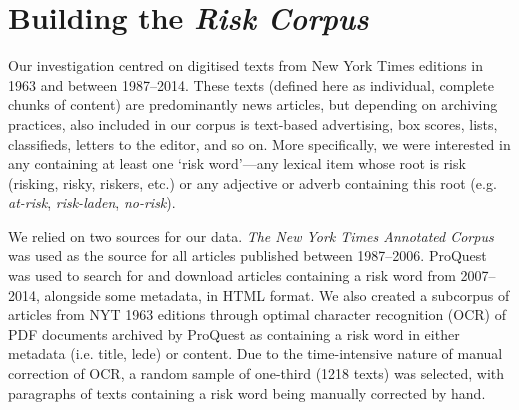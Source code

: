 \section{Building the \emph{Risk Corpus}}

Our investigation centred on digitised texts from New York Times editions in 1963 and between 1987--2014. These texts (defined here as individual, complete chunks of content) are predominantly news articles, but depending on archiving practices, also included in our corpus is text-based advertising, box scores, lists, classifieds, letters to the editor, and so on. More specifically, we were interested in any containing at least one `risk word'---any lexical item whose root is risk (risking, risky, riskers, etc.) or any adjective or adverb containing this root (e.g. \emph{at-risk}, \emph{risk-laden}, \emph{no-risk}).

We relied on two sources for our data. \emph{The New York Times Annotated Corpus} was used as the source for all articles published between 1987--2006. ProQuest was used to search for and download articles containing a risk word from 2007--2014, alongside some metadata, in HTML format. We also created a subcorpus of articles from NYT 1963 editions through optimal character recognition (OCR) of PDF documents archived by ProQuest as containing a risk word in either metadata (i.e. title, lede) or content. Due to the time-intensive nature of manual correction of OCR, a random sample of one-third (1218 texts) was selected, with paragraphs of texts containing a risk word being manually corrected by hand.



